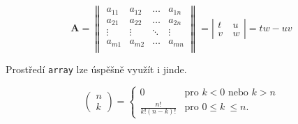 \documentclass[a4paper, twocolumn, 11pt]{article}
\begin{document}
$$ \mathbf{A} = 
\begin{Vmatrix}
a_{11} & a_{12} & \dots & a_{1n} \\
a_{21} & a_{22} & \dots & a_{2n} \\
\vdots & \vdots & \ddots & \vdots \\
a_{m1} & a_{m2} & \dots & a_{mn} \\
\end{Vmatrix} 
=
\left| \begin{array}{cc}
t & u\\
v~& w
\end{array} \right|
=
tw\!-\!uv
$$

Prostředí \texttt{array} lze úspěšně využít i jinde.

$$
\begin{pmatrix}
n \\
k\end{pmatrix}
=
\left\{\begin{array}{ll}
0 & \text{pro $k < 0$ nebo $k > n$} \\
\frac{n!}{k!(n-k)!} & \text{pro $0 \leq k~\leq n$.}
\end{array} \right.
$$
\end{document}
